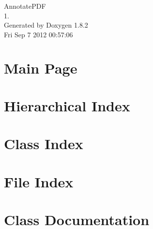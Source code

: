 \documentclass{book}
\begin{document}
\hypersetup{pageanchor=false,citecolor=blue}
\begin{titlepage}
\vspace*{7cm}
\begin{center}
{\Large Annotate\-P\-D\-F \\[1ex]\large 1. }\\
\vspace*{1cm}
{\large Generated by Doxygen 1.8.2}\\
\vspace*{0.5cm}
{\small Fri Sep 7 2012 00:57:06}\\
\end{center}
\end{titlepage}
\clearemptydoublepage
{}
\tableofcontents
\clearemptydoublepage
{}
\hypersetup{pageanchor=true,citecolor=blue}
\chapter{Main Page}
\label{index}\hypertarget{index}{}
\chapter{Hierarchical Index}

\chapter{Class Index}

\chapter{File Index}

\chapter{Class Documentation}













\end{document}
